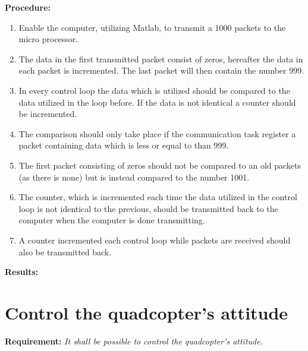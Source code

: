 \textbf{Procedure:}\\

\begin{enumerate}
	\item Enable the computer, utilizing Matlab, to transmit a 1000 packets to the micro processor.
	\item The data in the first transmitted packet consist of zeros, hereafter the data in each packet is incremented. The last packet will then contain the number 999. 
	\item In every control loop the data which is utilized should be compared to the data utilized in the loop before. If the data is not identical a counter should be incremented. 
	\item The comparison should only take place if the communication task register a packet containing data which is less or equal to than 999.
	\item The first packet consisting of zeros should not be compared to an old packets (as there is none) but is instead compared to the number 1001. 
	\item The counter, which is incremented each time the data utilized in the control loop is not identical to the previous, should be transmitted back to the computer when the computer is done transmitting.
	\item A counter incremented each control loop while packets are received should also be transmitted back.
\end{enumerate} 

\textbf{Results:}

\newpage

\section{Control the quadcopter's attitude}
\textbf{Requirement:}
\textit{It shall be possible to control the quadcopter's attitude.}


